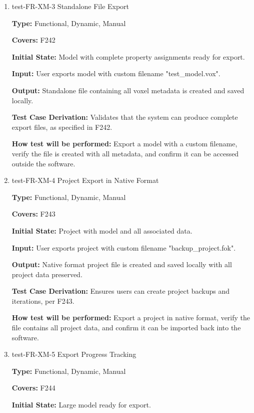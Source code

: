 \documentclass[12pt, titlepage]{article}
\begin{document}
\begin{enumerate}
\item{test-FR-XM-3 Standalone File Export\\}
\label{sec:t-xm-3}

\textbf{Type:} Functional, Dynamic, Manual

\textbf{Covers:} F242
					
\textbf{Initial State:} Model with complete property assignments ready for export.
					
\textbf{Input:} User exports model with custom filename "test\_model.vox".
					
\textbf{Output:} Standalone file containing all voxel metadata is created and saved locally.

\textbf{Test Case Derivation:} Validates that the system can produce complete export files, as specified in F242.
					
\textbf{How test will be performed:} Export a model with a custom filename, verify the file is created with all metadata, and confirm it can be accessed outside the software.

\item{test-FR-XM-4 Project Export in Native Format\\}
\label{sec:t-xm-4}

\textbf{Type:} Functional, Dynamic, Manual

\textbf{Covers:} F243
					
\textbf{Initial State:} Project with model and all associated data.
					
\textbf{Input:} User exports project with custom filename "backup\_project.fok".
					
\textbf{Output:} Native format project file is created and saved locally with all project data preserved.

\textbf{Test Case Derivation:} Ensures users can create project backups and iterations, per F243.
					
\textbf{How test will be performed:} Export a project in native format, verify the file contains all project data, and confirm it can be imported back into the software.

\item{test-FR-XM-5 Export Progress Tracking\\}
\label{sec:t-xm-5}

\textbf{Type:} Functional, Dynamic, Manual

\textbf{Covers:} F244
					
\textbf{Initial State:} Large model ready for export.
					

\end{enumerate}
\end{document}
